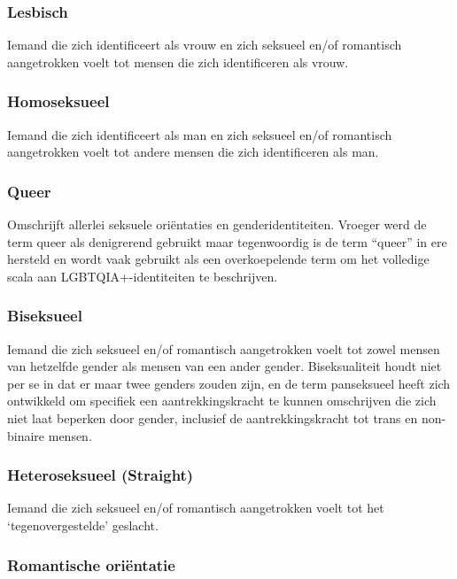 \documentclass[12pt,openany]{book}
\begin{document}
\subsubsection*{Lesbisch}

Iemand die zich identificeert als vrouw en zich seksueel en/of romantisch aangetrokken voelt tot mensen die zich identificeren als vrouw.

\subsubsection*{Homoseksueel}

Iemand die zich identificeert als man en zich seksueel en/of romantisch aangetrokken voelt tot andere mensen die zich identificeren als man.

\subsubsection*{Queer}

Omschrijft allerlei seksuele oriëntaties en genderidentiteiten. Vroeger werd de term queer als denigrerend gebruikt maar tegenwoordig is de term “queer” in ere hersteld en wordt vaak gebruikt als een overkoepelende term om het volledige scala aan LGBTQIA+-identiteiten te beschrijven.  

\subsubsection*{Biseksueel}

Iemand die zich seksueel en/of romantisch aangetrokken voelt tot zowel mensen van hetzelfde gender als mensen van een ander gender. Biseksualiteit houdt niet per se in dat er maar twee genders zouden zijn, en de term panseksueel heeft zich ontwikkeld om specifiek een aantrekkingskracht te kunnen omschrijven die zich niet laat beperken door gender, inclusief de aantrekkingskracht tot trans en non-binaire mensen.

\subsubsection*{Heteroseksueel (Straight)}

Iemand die zich seksueel en/of romantisch aangetrokken voelt tot het ‘tegenovergestelde’ geslacht.

\subsubsection*{Romantische oriëntatie}
\end{document}
